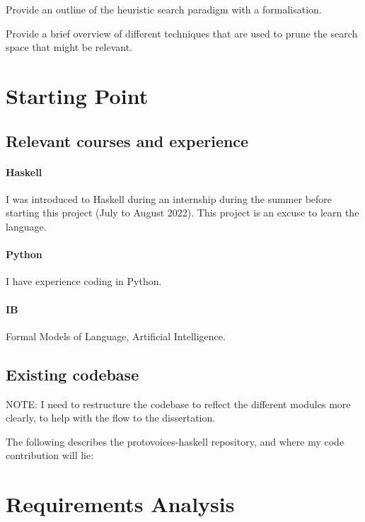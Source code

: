 \documentclass[12pt,a4paper,twoside,openright]{report}
\begin{document}
Provide an outline of the heuristic search paradigm with a formalisation.
\par
Provide a brief overview of different techniques that are used to prune the search space that might be relevant.

\section{Starting Point}

\subsection{Relevant courses and experience}

\paragraph{Haskell}{I was introduced to Haskell during an internship during the summer before starting this project (July to August 2022). This project is an excuse to learn the language.}
\paragraph{Python}{I have experience coding in Python.}

\paragraph{IB}{ Formal Models of Language, Artificial Intelligence.}

\subsection{Existing codebase}
NOTE: I need to restructure the codebase to reflect the different modules more clearly, to help with the flow to the dissertation.

The following describes the protovoices-haskell repository, and where my code contribution will lie:
\par
\medskip
{}

\section{Requirements Analysis}
\end{document}
